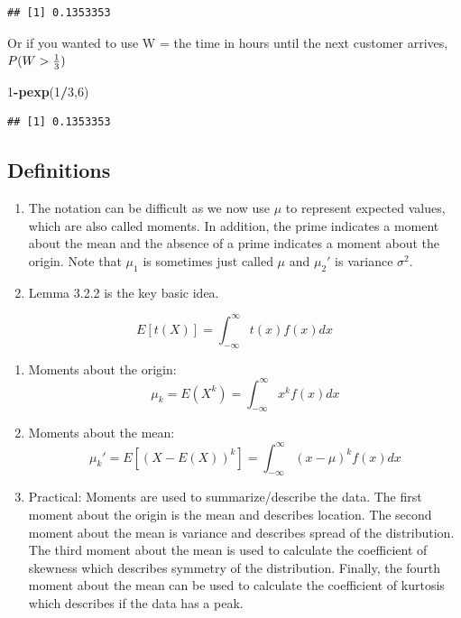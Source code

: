 \documentclass[]{book}
\newenvironment{Shaded}{\begin{snugshade}}{\end{snugshade}}
\newcommand{\KeywordTok}[1]{\textcolor[rgb]{0.13,0.29,0.53}{\textbf{#1}}}
\newcommand{\DecValTok}[1]{\textcolor[rgb]{0.00,0.00,0.81}{#1}}
\newcommand{\OperatorTok}[1]{\textcolor[rgb]{0.81,0.36,0.00}{\textbf{#1}}}
\newcommand{\NormalTok}[1]{#1}
\theoremstyle{definition}
\theoremstyle{definition}
\theoremstyle{definition}
\theoremstyle{remark}
\begin{document}
\begin{verbatim}
## [1] 0.1353353
\end{verbatim}

Or if you wanted to use W = the time in hours until the next customer
arrives, \(P(W>{1 \over 3})\)

\begin{Shaded}
\begin{Highlighting}[]
\DecValTok{1}\OperatorTok{-}\KeywordTok{pexp}\NormalTok{(}\DecValTok{1}\OperatorTok{/}\DecValTok{3}\NormalTok{,}\DecValTok{6}\NormalTok{)}
\end{Highlighting}
\end{Shaded}

\begin{verbatim}
## [1] 0.1353353
\end{verbatim}

\subsection{Definitions}\label{definitions-2}

\begin{enumerate}
\def\labelenumi{\arabic{enumi}.}
\item
  The notation can be difficult as we now use \(\mu\) to represent
  expected values, which are also called moments. In addition, the prime
  indicates a moment about the mean and the absence of a prime indicates
  a moment about the origin. Note that \(\mu_1\) is sometimes just
  called \(\mu\) and \(\mu_{2}'\) is variance \(\sigma ^2\).
\item
  Lemma 3.2.2 is the key basic idea.
\end{enumerate}

\[E[t(X)]=\int_{-\infty}^{\infty}t(x)f(x)dx\]

\begin{enumerate}
\def\labelenumi{\arabic{enumi}.}
\setcounter{enumi}{2}
\item
  Moments about the origin:
  \[\mu_{k}=E(X^k)=\int_{-\infty}^{\infty}x^k f(x)dx\]
\item
  Moments about the mean:
  \[\mu_{k}'=E[(X-E(X))^k]=\int_{-\infty}^{\infty}(x-\mu)^k f(x)dx\]
\item
  Practical: Moments are used to summarize/describe the data. The first
  moment about the origin is the mean and describes location. The second
  moment about the mean is variance and describes spread of the
  distribution. The third moment about the mean is used to calculate the
  coefficient of skewness which describes symmetry of the distribution.
  Finally, the fourth moment about the mean can be used to calculate the
  coefficient of kurtosis which describes if the data has a peak.
\end{enumerate}
\end{document}
